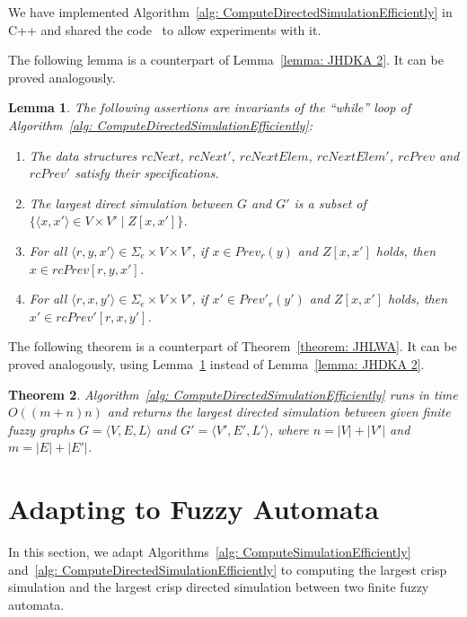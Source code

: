 \documentclass[11pt]{article}
\newcommand{\red}[1]{{#1}\xspace}
\def\tuple#1{\langle#1\rangle}
\newcommand{\SE}{\Sigma_e}
\newcommand{\Prev}{\mathit{Prev}}
\newcommand{\PrevP}{\mathit{Prev}'}
\newcommand{\rcNextP}{\mathit{rcNext}'}
\newcommand{\rcPrev}{\mathit{rcPrev}}
\newcommand{\rcNextElemP}{\mathit{rcNextElem}'}
\newcommand{\rcNext}{\mathit{rcNext}}
\newcommand{\rcPrevP}{\mathit{rcPrev}'}
\newcommand{\rcNextElem}{\mathit{rcNextElem}}
\newtheorem{theorem}{Theorem}[section]
\newtheorem{lemma}[theorem]{Lemma}
\begin{document}
We have implemented Algorithm~\ref{alg: ComputeDirectedSimulationEfficiently} in C++ and shared the code~\cite{compCSfFS-impl} to allow experiments with it.  

The following lemma is a counterpart of Lemma~\ref{lemma: JHDKA 2}. 
It can be proved analogously. 

\begin{lemma}\label{lemma: DJWYS 2}
The following assertions are invariants of the ``while'' loop of Algorithm~\ref{alg: ComputeDirectedSimulationEfficiently}: 
\begin{enumerate}
\item The data structures $\rcNext$, $\rcNextP$, $\rcNextElem$, $\rcNextElemP$, $\rcPrev$ and $\rcPrevP$ satisfy their specifications. 

\item The largest direct simulation between $G$ and $G'$ is a subset of $\{\tuple{x,x'} \in V \times V' \mid Z[x,x']\}$.

\item For all $\tuple{r,y,x'} \in \SE \times V \times V'$, if $x \in \Prev_r(y)$ and $Z[x,x']$ holds, then $x \in \rcPrev[r,y,x']$. 

\item For all $\tuple{r,x,y'} \in \SE \times V \times V'$, if $x' \in \PrevP_r(y')$ and $Z[x,x']$ holds, then $x' \in \rcPrevP[r,x,y']$. 
\end{enumerate}
\end{lemma}

The following theorem is a counterpart of Theorem~\ref{theorem: JHLWA}. It can be proved analogously, using Lemma~\ref{lemma: DJWYS 2}
 instead of Lemma~\ref{lemma: JHDKA 2}. 
 
\begin{theorem}\label{theorem: JHLWA 2}
Algorithm~\ref{alg: ComputeDirectedSimulationEfficiently} runs in time $O((m+n)n)$ and returns the largest directed simulation between given finite fuzzy graphs $G = \tuple{V,E,L}$ and $G' = \tuple{V',E',L'}$, where $n = |V| + |V'|$ and $m = |E| + |E'|$. 
\end{theorem}

\section{Adapting to Fuzzy Automata}
\label{sec: HFKDS}

\red{In this section, we adapt Algorithms~\ref{alg: ComputeSimulationEfficiently} and~\ref{alg: ComputeDirectedSimulationEfficiently} to computing the largest crisp simulation and the largest crisp directed simulation between two finite fuzzy automata.} 
\end{document}
